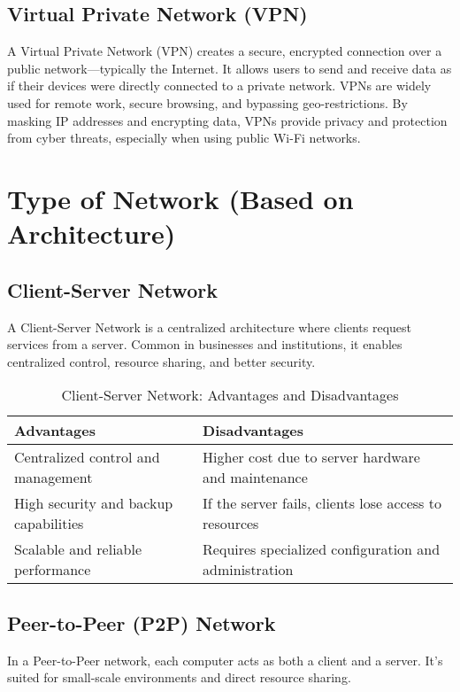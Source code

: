 \subsection{Virtual Private Network (VPN)}
A Virtual Private Network (VPN) creates a secure, encrypted connection over a public network—typically the Internet. It allows users to send and receive data as if their devices were directly connected to a private network. VPNs are widely used for remote work, secure browsing, and bypassing geo-restrictions. By masking IP addresses and encrypting data, VPNs provide privacy and protection from cyber threats, especially when using public Wi-Fi networks.


\section{Type of Network (Based on Architecture)}

\subsection{Client-Server Network}
A Client-Server Network is a centralized architecture where clients request services from a server. Common in businesses and institutions, it enables centralized control, resource sharing, and better security.

\begin{table}[H]
\centering
\caption{Client-Server Network: Advantages and Disadvantages}
\begin{tabularx}{\linewidth}{|X|X|}
\hline
\textbf{Advantages} & \textbf{Disadvantages} \\
\hline
Centralized control and management & Higher cost due to server hardware and maintenance \\
\hline
High security and backup capabilities & If the server fails, clients lose access to resources \\
\hline
Scalable and reliable performance & Requires specialized configuration and administration \\
\hline
\end{tabularx}
\end{table}

\subsection{Peer-to-Peer (P2P) Network}
In a Peer-to-Peer network, each computer acts as both a client and a server. It's suited for small-scale environments and direct resource sharing.

